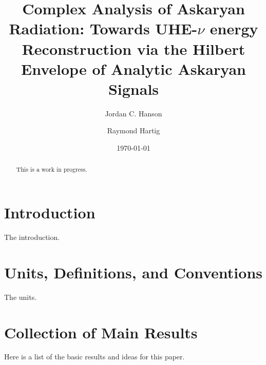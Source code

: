 \documentclass[amsmath,amssymb,aps,prd,10pt,twocolumn,showkeys]{revtex4}
\begin{document}
\title{Complex Analysis of Askaryan Radiation: Towards UHE-$\nu$ energy Reconstruction via the Hilbert Envelope of Analytic Askaryan Signals}

\author{Jordan C. Hanson}
\author{Raymond Hartig}
\date{\today}

\begin{abstract}
This is a work in progress.
\end{abstract}


\maketitle

\section{Introduction}

The introduction.

\section{Units, Definitions, and Conventions}
\label{sec:unit}

The units.

\section{Collection of Main Results}
\label{sec:onc}

Here is a list of the basic results and ideas for this paper.
\end{document}
